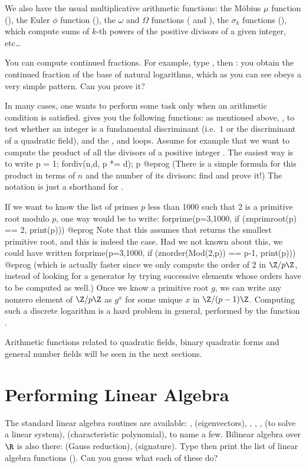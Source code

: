 We also have the usual multiplicative arithmetic functions: the M\"obius $\mu$
function (), the Euler $\phi$ function (), the
$\omega$ and $\Omega$ functions ( and ), the
$\sigma_k$ functions (), which compute sums of $k$-th powers of the
positive divisors of a given integer, etc\dots

You can compute continued fractions. For example, type , then
: you obtain the continued fraction of the base of
natural logarithms, which as you can see obeys a very simple pattern. Can
you prove it?

In many cases, one wants to perform some task only when an arithmetic
condition is satisfied.  gives you the following functions: 
as mentioned above, ,  to test whether an
integer is a fundamental discriminant (i.e.~$1$ or the discriminant of a
quadratic field), and the ,  and 
loops. Assume for example that we want to compute the product of all the
divisors of a positive integer . The easiest way is to write
\bprog
  p = 1; fordiv(n,d, p *= d); p
@eprog\noindent
(There is a simple formula for this product in terms of $n$ and the number of
its divisors: find and prove it!) The notation  is just a
shorthand for .

If we want to know the list of primes $p$ less than 1000 such that 2 is a
primitive root modulo $p$, one way would be to write:
\bprog
  forprime(p=3,1000, if (znprimroot(p) == 2, print(p)))
@eprog\noindent
%
Note that this assumes that  returns the smallest primitive
root, and this is indeed the case. Had we not known about this, we could
have written
\bprog
  forprime(p=3,1000, if (znorder(Mod(2,p)) == p-1, print(p)))
@eprog\noindent
%
(which is actually faster since we only compute the order of $2$ in $\Z/p\Z$,
instead of looking for a generator by trying successive elements whose orders
have to be computed as well.) Once we know a primitive root $g$, we can write
any nonzero element of $\Z/p\Z$ as $g^x$ for some unique $x$ in $\Z/(p-1)\Z$.
Computing such a discrete logarithm is a hard problem in general, performed
by the function .

Arithmetic functions related to quadratic fields, binary quadratic forms and
general number fields will be seen in the next sections.

\section{Performing Linear Algebra}
The standard linear algebra routines are available: ,
 (eigenvectors), , , ,
 (to solve a linear system),  (characteristic
polynomial), to name a few. Bilinear algebra over $\R$ is also there:
 (Gauss reduction),  (signature).
Type  then print the list of linear algebra functions ().
Can you guess what each of these do?

